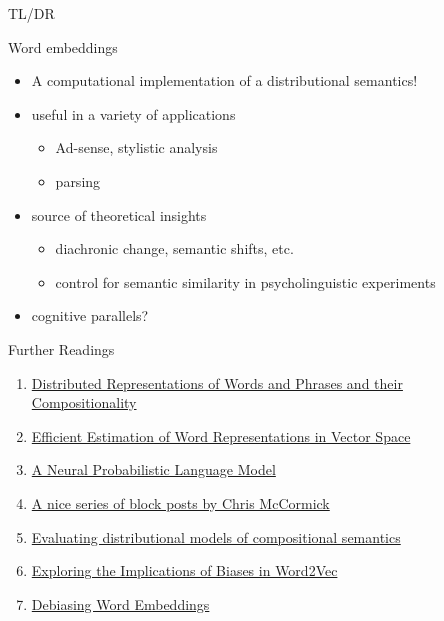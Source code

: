 \documentclass[professionalfonts, xcolor={usenames,svgnames,x11names,table}]{beamer}
\begin{document}
\begin{frame}{TL/DR}
\begin{block}{Word embeddings}
\begin{itemize}
\item A computational implementation of a \alert{distributional semantics}!
\end{itemize}
\end{block}
\begin{itemize}
\item useful in a variety of applications
\begin{itemize}
\item Ad-sense, stylistic analysis
\item parsing 
\end{itemize}
\item source of theoretical insights
\begin{itemize}
\item diachronic change, semantic shifts, etc.
\item control for semantic similarity in psycholinguistic experiments
\end{itemize}
\item cognitive parallels?
\end{itemize}
\vspace{0.3cm}
\end{frame}

\begin{frame}{Further Readings}
\begin{enumerate}
\item \href{https://papers.nips.cc/paper/5021-distributed-representations-of-words-and-phrases-and-their-compositionality.pdf}{Distributed Representations of Words and Phrases and their Compositionality}
\item \href{https://arxiv.org/pdf/1301.3781.pdf}{Efficient Estimation of Word Representations in Vector Space}
\item \href{http://www.jmlr.org/papers/volume3/bengio03a/bengio03a.pdf}{A Neural Probabilistic Language Model}
\item \href{http://mccormickml.com/}{A nice series of block posts by Chris McCormick}
\item \href{http://sro.sussex.ac.uk/id/eprint/61062/1/Batchkarov,\%20Miroslav\%20Manov.pdf}{Evaluating distributional models of compositional semantics}
\item \href{http://www.mattkenney.me/google-word2vec-biases/}{Exploring the Implications of Biases in Word2Vec}
\item \href{https://arxiv.org/pdf/1607.06520.pdf}{Debiasing Word Embeddings}
\end{enumerate}
\end{frame}
\end{document}
